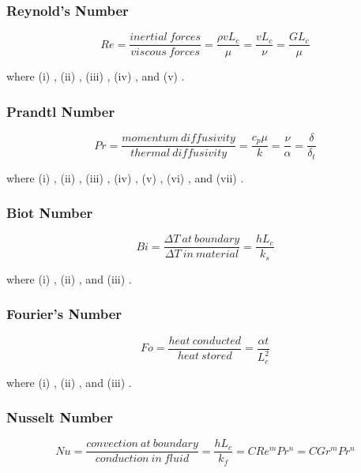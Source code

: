 \documentclass{article}
\begin{document}
\subsubsection{Reynold's Number}\label{sec:re}
\begin{equation}
        Re = \frac{inertial\ forces}{viscous\ forces} = 
        \frac{\rho v L_c}{\mu} = 
        \frac{v L_c}{\nu} = \frac{G L_c}{\mu}
\end{equation}

where (i) \massdensity, (ii) \flowvelocity, (iii) \characteristiclength, (iv) \dynamicviscosity, and (v) \kinematicviscosity.

\subsubsection{Prandtl Number}\label{sec:pr}
\begin{equation}
        Pr = \frac{momentum\ diffusivity}{thermal\ diffusivity} =
        \frac{c_p \mu}{k} =
        \frac{\nu}{\alpha} =
        \frac{\delta}{\delta_t}
\end{equation}

where (i) \specificheat, (ii) \dynamicviscosity, (iii) \theramlconductivity, (iv) \kinematicviscosity, (v) \thermaldiffusivity, (vi) \boundarylayer, and (vii) \thermalboundarylayer.

\subsubsection{Biot Number}\label{sec:bi}
\begin{equation}
        Bi = \frac{\Delta T\ at\ boundary}{\Delta T\ in\ material} = 
        \frac{h L_c}{k_s}
\end{equation}

where (i) \convectiveheattransfercoeff, (ii) \characteristiclength, and (iii) \characteristiclength.

\subsubsection{Fourier's Number}\label{sec:fo}
\begin{equation}
    Fo = \frac{heat\ conducted}{heat\ stored} = 
    \frac{\alpha t}{L_c^2}
\end{equation}

where (i) \thermaldiffusivity, (ii) \timeblurb, and (iii) \characteristiclength.

\subsubsection{Nusselt Number}\label{sec:nu}
\begin{equation}
    Nu = \frac{convection\ at\ boundary}{conduction\ in\ fluid} = 
    \frac{h L_c}{k_f} =
    C Re^m Pr^n =
    C Gr^m Pr^n
\end{equation}
\end{document}
